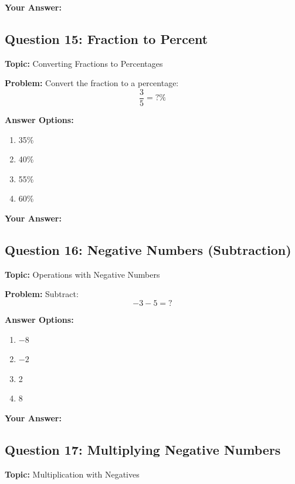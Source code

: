 \documentclass[12pt]{article}
\begin{document}
\noindent\textbf{Your Answer:} \underline{\hspace{2cm}}

\vspace{0.5cm}


\subsection{Question 15: Fraction to Percent}
\textbf{Topic:} Converting Fractions to Percentages

\textbf{Problem:} Convert the fraction to a percentage:
\[\frac{3}{5} = ?\%\]

\textbf{Answer Options:}
\begin{enumerate}[label=\Alph*)]
    \item 35\%
    \item 40\%
    \item 55\%
    \item 60\%
\end{enumerate}

\noindent\textbf{Your Answer:} \underline{\hspace{2cm}}

\vspace{0.5cm}


\subsection{Question 16: Negative Numbers (Subtraction)}
\textbf{Topic:} Operations with Negative Numbers

\textbf{Problem:} Subtract:
\[-3 - 5 = ?\]

\textbf{Answer Options:}
\begin{enumerate}[label=\Alph*)]
    \item $-8$
    \item $-2$
    \item 2
    \item 8
\end{enumerate}

\noindent\textbf{Your Answer:} \underline{\hspace{2cm}}

\vspace{0.5cm}


\subsection{Question 17: Multiplying Negative Numbers}
\textbf{Topic:} Multiplication with Negatives
\end{document}
